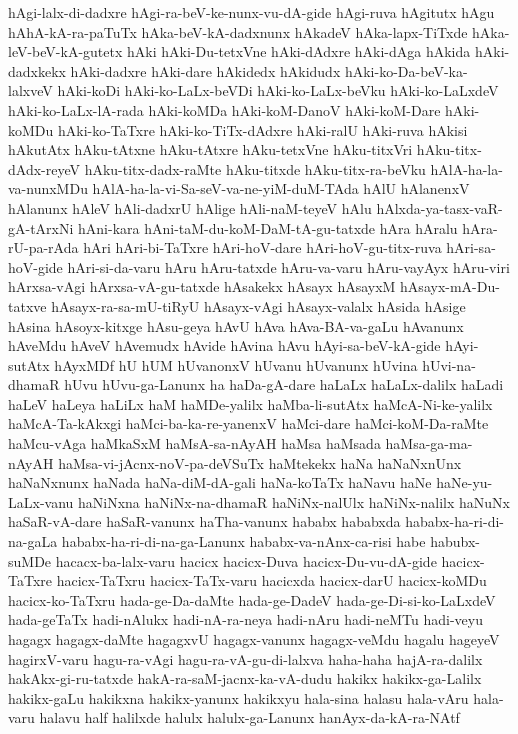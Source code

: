 {hAgi-lalx-di-dadxre
hAgi-ra-beV-ke-nunx-vu-dA-gide
hAgi-ruva
hAgitutx
hAgu
hAhA-kA-ra-paTuTx
hAka-beV-kA-dadxnunx
hAkadeV
hAka-lapx-TiTxde
hAka-leV-beV-kA-gutetx
hAki
hAki-Du-tetxVne
hAki-dAdxre
hAki-dAga
hAkida
hAki-dadxkekx
hAki-dadxre
hAki-dare
hAkidedx
hAkidudx
hAki-ko-Da-beV-ka-lalxveV
hAki-koDi
hAki-ko-LaLx-beVDi
hAki-ko-LaLx-beVku
hAki-ko-LaLxdeV
hAki-ko-LaLx-lA-rada
hAki-koMDa
hAki-koM-DanoV
hAki-koM-Dare
hAki-koMDu
hAki-ko-TaTxre
hAki-ko-TiTx-dAdxre
hAki-ralU
hAki-ruva
hAkisi
hAkutAtx
hAku-tAtxne
hAku-tAtxre
hAku-tetxVne
hAku-titxVri
hAku-titx-dAdx-reyeV
hAku-titx-dadx-raMte
hAku-titxde
hAku-titx-ra-beVku
hAlA-ha-la-va-nunxMDu
hAlA-ha-la-vi-Sa-seV-va-ne-yiM-duM-TAda
hAlU
hAlanenxV
hAlanunx
hAleV
hAli-dadxrU
hAlige
hAli-naM-teyeV
hAlu
hAlxda-ya-tasx-vaR-gA-tArxNi
hAni-kara
hAni-taM-du-koM-DaM-tA-gu-tatxde
hAra
hAralu
hAra-rU-pa-rAda
hAri
hAri-bi-TaTxre
hAri-hoV-dare
hAri-hoV-gu-titx-ruva
hAri-sa-hoV-gide
hAri-si-da-varu
hAru
hAru-tatxde
hAru-va-varu
hAru-vayAyx
hAru-viri
hArxsa-vAgi
hArxsa-vA-gu-tatxde
hAsakekx
hAsayx
hAsayxM
hAsayx-mA-Du-tatxve
hAsayx-ra-sa-mU-tiRyU
hAsayx-vAgi
hAsayx-valalx
hAsida
hAsige
hAsina
hAsoyx-kitxge
hAsu-geya
hAvU
hAva
hAva-BA-va-gaLu
hAvanunx
hAveMdu
hAveV
hAvemudx
hAvide
hAvina
hAvu
hAyi-sa-beV-kA-gide
hAyi-sutAtx
hAyxMDf
hU
hUM
hUvanonxV
hUvanu
hUvanunx
hUvina
hUvi-na-dhamaR
hUvu
hUvu-ga-Lanunx
ha
haDa-gA-dare
haLaLx
haLaLx-dalilx
haLadi
haLeV
haLeya
haLiLx
haM
haMDe-yalilx
haMba-li-sutAtx
haMcA-Ni-ke-yalilx
haMcA-Ta-kAkxgi
haMci-ba-ka-re-yanenxV
haMci-dare
haMci-koM-Da-raMte
haMcu-vAga
haMkaSxM
haMsA-sa-nAyAH
haMsa
haMsada
haMsa-ga-ma-nAyAH
haMsa-vi-jAcnx-noV-pa-deVSuTx
haMtekekx
haNa
haNaNxnUnx
haNaNxnunx
haNada
haNa-diM-dA-gali
haNa-koTaTx
haNavu
haNe
haNe-yu-LaLx-vanu
haNiNxna
haNiNx-na-dhamaR
haNiNx-nalUlx
haNiNx-nalilx
haNuNx
haSaR-vA-dare
haSaR-vanunx
haTha-vanunx
hababx
hababxda
hababx-ha-ri-di-na-gaLa
hababx-ha-ri-di-na-ga-Lanunx
hababx-va-nAnx-ca-risi
habe
habubx-suMDe
hacacx-ba-lalx-varu
hacicx
hacicx-Duva
hacicx-Du-vu-dA-gide
hacicx-TaTxre
hacicx-TaTxru
hacicx-TaTx-varu
hacicxda
hacicx-darU
hacicx-koMDu
hacicx-ko-TaTxru
hada-ge-Da-daMte
hada-ge-DadeV
hada-ge-Di-si-ko-LaLxdeV
hada-geTaTx
hadi-nAlukx
hadi-nA-ra-neya
hadi-nAru
hadi-neMTu
hadi-veyu
hagagx
hagagx-daMte
hagagxvU
hagagx-vanunx
hagagx-veMdu
hagalu
hageyeV
hagirxV-varu
hagu-ra-vAgi
hagu-ra-vA-gu-di-lalxva
haha-haha
hajA-ra-dalilx
hakAkx-gi-ru-tatxde
hakA-ra-saM-jacnx-ka-vA-dudu
hakikx
hakikx-ga-Lalilx
hakikx-gaLu
hakikxna
hakikx-yanunx
hakikxyu
hala-sina
halasu
hala-vAru
hala-varu
halavu
half
halilxde
halulx
halulx-ga-Lanunx
hanAyx-da-kA-ra-NAtf
}
